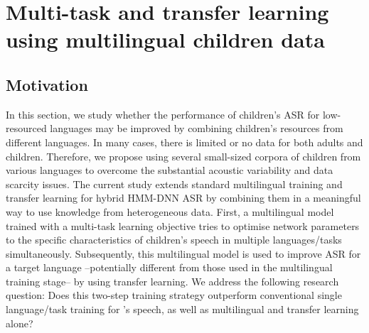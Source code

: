 \section{Multi-task and transfer learning using multilingual children data}
\subsection{Motivation}
In this section, we study whether the performance of children's ASR for low-resourced languages may be improved by combining children's resources from different languages. In many cases, there is limited or no data for both adults and children. Therefore, we propose using several small-sized corpora of children from various languages to overcome the substantial acoustic variability and data scarcity issues. The current study extends standard multilingual training and transfer learning for hybrid HMM-DNN ASR by combining them in a meaningful way to use knowledge from heterogeneous data. First, a multilingual model trained with a multi-task learning objective tries to optimise network parameters to the specific characteristics of children's speech in multiple languages/tasks simultaneously. Subsequently, this multilingual model is used to improve ASR for a target language --potentially different from those used in the multilingual training stage-- by using transfer learning. We address the following research question: Does this two-step training strategy outperform conventional single language/task training for 's speech, as well as multilingual and transfer learning alone?

